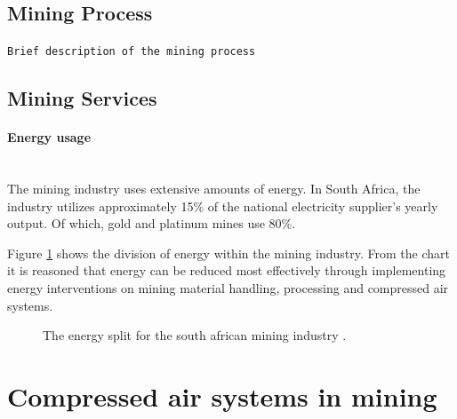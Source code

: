 \subsection{Mining Process}
\texttt{Brief description of the mining process}
\subsection{Mining Services}

\paragraph{Energy usage}\leavevmode\\
The mining industry uses extensive amounts of energy. In South Africa, the industry utilizes approximately 15\% of the national electricity supplier's yearly output. Of which, gold and platinum mines use 80\%.\cite{Eskom2010Energy}\par
Figure \ref{fig: Energy Split} shows the division of energy within the mining industry. From the chart it is reasoned that energy can be reduced most effectively through implementing energy interventions on mining material handling, processing and compressed air systems.
\begin{figure}[h]
	\centering
	\caption[The energy split for the south african mining industry.]{The energy split for the south african mining industry \cite{Eskom2010Energy}.}
	\label{fig: Energy Split}
\end{figure}

\section{Compressed air systems in mining}
